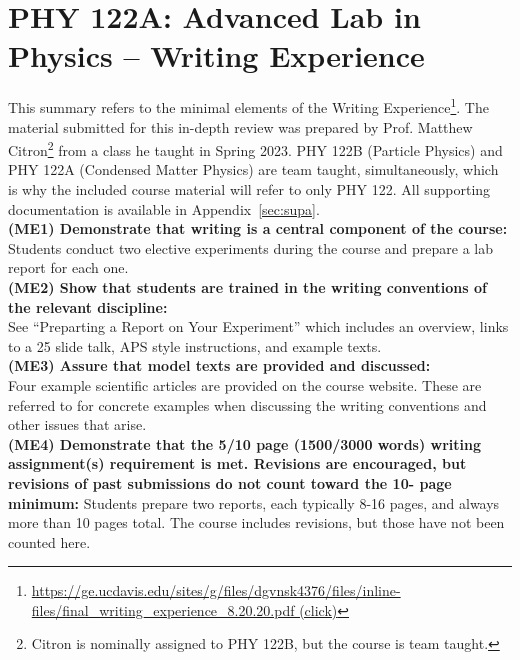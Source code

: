 \documentclass[12pt]{article}
\begin{document}


%


\newpage
\section{PHY 122A:  Advanced Lab in Physics -- Writing Experience}

This summary refers to the minimal elements of the Writing
Experience\footnote{
\href{https://ge.ucdavis.edu/sites/g/files/dgvnsk4376/files/inline-files/final\_writing\_experience\_8.20.20.pdf}{https://ge.ucdavis.edu/sites/g/files/dgvnsk4376/files/inline-files/final\_writing\_experience\_8.20.20.pdf (click)}}.  The material submitted for this in-depth review was prepared by Prof. Matthew
Citron\footnote{Citron is nominally assigned to PHY 122B, but the course is team taught.}
from a class he taught in Spring 2023.  PHY 122B (Particle
Physics) and PHY 122A (Condensed Matter Physics) are team taught,
simultaneously, which is why the included course material will refer
to only PHY 122.  All supporting documentation is available in Appendix~\ref{sec:supa}.\\

\noindent
{\bf (ME1) Demonstrate that writing is a central component of the course:}
Students conduct two elective experiments during the course and prepare a lab
report for each one.\\[2pt]

\noindent
{\bf (ME2) Show that students are trained in the writing conventions of the relevant discipline:}\\
See ``Preparting a Report on Your Experiment'' which includes an overview, links to a 25 slide talk, APS style instructions, and example texts. \\[3pt]
\noindent
{\bf (ME3) Assure that model texts are provided and discussed:}\\
Four example scientific articles are provided on the course website.  These are referred to for concrete examples when discussing the writing conventions and other issues that arise.\\[3pt]

\noindent
{\bf (ME4) Demonstrate that the 5/10 page (1500/3000 words) writing assignment(s) requirement is
met. Revisions are encouraged, but revisions of past submissions do not count toward the 10-
page minimum:} Students prepare two reports, each typically 8-16 pages, and always more than 10 pages total.  The course includes revisions, but those have not been counted here.
\end{document}

